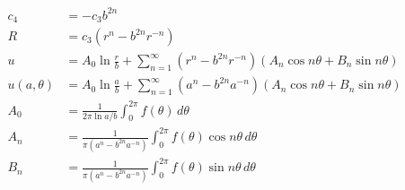 \documentclass{article}
\begin{document}
\begin{align*}
  c_4                        & = -c_3 b^{2 n}                                                                                             \\
  R                          & = c_3 (r^n - b^{2 n} r^{-n})                                                                               \\
  u                          & = A_0 \ln \frac{r}{b} + \sum_{n = 1}^\infty (r^n - b^{2 n} r^{-n}) (A_n \cos n \theta + B_n \sin n \theta) \\
  u(a, \theta)               & = A_0 \ln \frac{a}{b} + \sum_{n = 1}^\infty (a^n - b^{2 n} a^{-n}) (A_n \cos n \theta + B_n \sin n \theta) \\
  A_0                        & = \frac{1}{2 \pi \ln a / b} \int_0^{2 \pi} f(\theta) \,d \theta                                            \\
  A_n                        & = \frac{1}{\pi (a^n - b^{2 n} a^{-n})} \int_0^{2 \pi} f(\theta) \cos n \theta \,d \theta                   \\
  B_n                        & = \frac{1}{\pi (a^n - b^{2 n} a^{-n})} \int_0^{2 \pi} f(\theta) \sin n \theta \,d \theta                   \\
\end{align*}

\setcounter{subsubsection}{18}
\subsubsection{}
\end{document}
